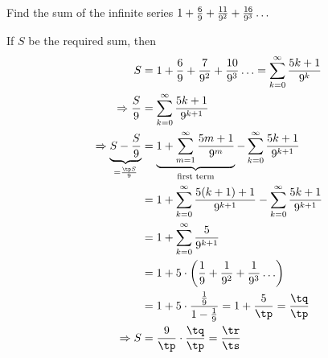 \gcalcexpr[0]
\gcalcexpr[0]
\gcalcexpr[0]\tr{\vbone * \tq}
\gcalcexpr[0]\ts{\tp * \tp }


\question[4] Find the sum of the infinite series $1 + \frac{6}{9} + \frac{11}{9^2} + 
\frac{16}{9^3}\ldots$

\watchout
{}

\ifprintanswers
\fi 

\begin{solution}[\halfpage]
	If $S$ be the required sum, then
	\begin{align}
		S &= 1 + \frac{\vbthree}{\vbone} + \frac{7}{\vbone^2} + \frac{10}{\vbone^3}\ldots = 
      \sum_{k=0}^{\infty}\dfrac{\vbtwo k+1}{\vbone^k} \\
		\Rightarrow\dfrac{S}{\vbone} &= \sum_{k=0}^{\infty}\dfrac{\vbtwo k+1}{\vbone^{k+1}} \\
		\Rightarrow \underbrace{S - \dfrac{S}{\vbone}}_{= \frac{\tp S}{\vbone}} &= \underbrace{1 + \sum_{m=1}^{\infty}\dfrac{\vbtwo m+1}{\vbone^m}}
		_{\text{first term}}- \sum_{k=0}^{\infty}\dfrac{\vbtwo k+1}{\vbone^{k+1}} \\
		&= 1 + \sum_{k=0}^{\infty}\dfrac{\vbtwo (k+1)+1}{\vbone^{k+1}}-\sum_{k=0}^{\infty}\dfrac{\vbtwo k+1}{\vbone^{k+1}} \\
		&= 1 + \sum_{k=0}^{\infty}\dfrac{\vbtwo }{\vbone^{k+1}} \\
		&= 1 + \vbtwo\cdot\left( \dfrac{1}{\vbone} + \dfrac{1}{\vbone^2} + \dfrac{1}{\vbone^3}\ldots \right) \\
		&= 1 + \vbtwo\cdot\dfrac{\frac{1}{\vbone}}{1-\frac{1}{\vbone}} = 1 + \dfrac{\vbtwo}{\tp } = \dfrac{\tq}{\tp } \\
		\Rightarrow S &= \dfrac{\vbone}{\tp }\cdot\dfrac{\tq}{\tp } = \dfrac{\tr}{\ts}
	\end{align}
\end{solution}
